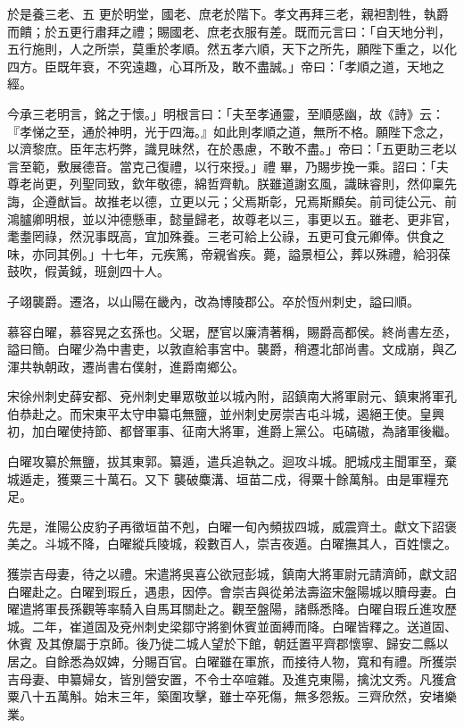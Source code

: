 \begin{pinyinscope}
 於是養三老、五
 更於明堂，國老、庶老於階下。孝文再拜三老，親袒割牲，執爵而饋；於五更行肅拜之禮；賜國老、庶老衣服有差。既而元言曰：「自天地分判，五行施則，人之所崇，莫重於孝順。然五孝六順，天下之所先，願陛下重之，以化四方。臣既年衰，不究遠趣，心耳所及，敢不盡誠。」帝曰：「孝順之道，天地之經。



 今承三老明言，銘之于懷。」明根言曰：「夫至孝通靈，至順感幽，故《詩》云：『孝悌之至，通於神明，光于四海。』如此則孝順之道，無所不格。願陛下念之，以濟黎庶。臣年志朽弊，識見昧然，在於愚慮，不敢不盡。」帝曰：「五更助三老以言至範，敷展德音。當克己復禮，以行來授。」禮
 畢，乃賜步挽一乘。詔曰：「夫尊老尚更，列聖同致，欽年敬德，綿哲齊軌。朕雖道謝玄風，識昧睿則，然仰稟先誨，企遵猷旨。故推老以德，立更以元；父焉斯彰，兄焉斯顯矣。前司徒公元、前鴻臚卿明根，並以沖德懸車，懿量歸老，故尊老以三，事更以五。雖老、更非官，耄耋罔祿，然況事既高，宜加殊養。三老可給上公祿，五更可食元卿俸。供食之味，亦同其例。」十七年，元疾篤，帝親省疾。薨，謚景桓公，葬以殊禮，給羽葆鼓吹，假黃鉞，班劍四十人。



 子翊襲爵。遷洛，以山陽在畿內，改為博陵郡公。卒於恆州刺史，謚曰順。



 慕容白曜，慕容晃之玄孫也。父琚，歷官以廉清著稱，賜爵高都侯。終尚書左丞，謚曰簡。白曜少為中書吏，以敦直給事宮中。襲爵，稍遷北部尚書。文成崩，與乙渾共執朝政，遷尚書右僕射，進爵南鄉公。



 宋徐州刺史薛安都、兗州刺史畢眾敬並以城內附，詔鎮南大將軍尉元、鎮東將軍孔伯恭赴之。而宋東平太守申纂屯無鹽，並州刺史房崇吉屯斗城，遏絕王使。皇興初，加白曜使持節、都督軍事、征南大將軍，進爵上黨公。屯碻磝，為諸軍後繼。



 白曜攻纂於無鹽，拔其東郭。纂遁，遣兵追執之。迴攻斗城。肥城戍主聞軍至，棄城遁走，獲粟三十萬石。又下
 襲破麋溝、垣苗二戍，得粟十餘萬斛。由是軍糧充足。



 先是，淮陽公皮豹子再徵垣苗不剋，白曜一旬內頻拔四城，威震齊土。獻文下詔褒美之。斗城不降，白曜縱兵陵城，殺數百人，崇吉夜遁。白曜撫其人，百姓懷之。



 獲崇吉母妻，待之以禮。宋遣將吳喜公欲冠彭城，鎮南大將軍尉元請濟師，獻文詔白曜赴之。白曜到瑕丘，遇患，因停。會崇吉與從弟法壽盜宋盤陽城以贖母妻。白曜遣將軍長孫觀等率騎入自馬耳關赴之。觀至盤陽，諸縣悉降。白曜自瑕丘進攻歷城。二年，崔道固及兗州刺史梁鄒守將劉休賓並面縛而降。白曜皆釋之。送道固、休賓
 及其僚屬于京師。後乃徙二城人望於下館，朝廷置平齊郡懷寧、歸安二縣以居之。自餘悉為奴婢，分賜百官。白曜雖在軍旅，而接待人物，寬和有禮。所獲崇吉母妻、申纂婦女，皆別營安置，不令士卒喧雜。及進克東陽，擒沈文秀。凡獲倉粟八十五萬斛。始末三年，築圍攻擊，雖士卒死傷，無多怨叛。三齊欣然，安堵樂業。




\end{pinyinscope}
